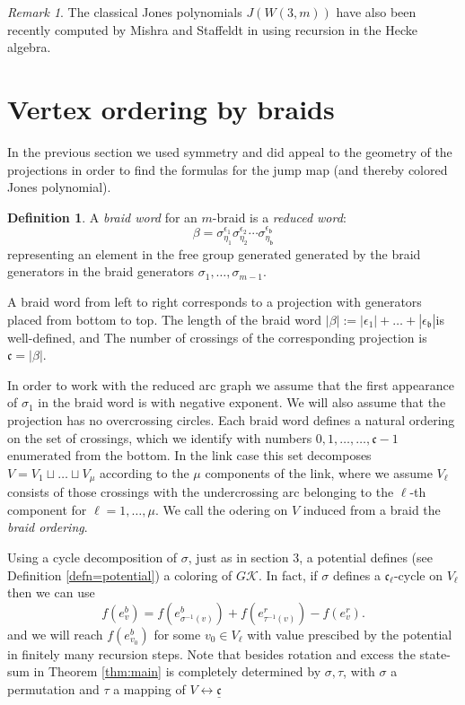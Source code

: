 \documentclass[11pt]{article}
\theoremstyle{definition}
\newtheorem{defn}{Definition}[section]
\theoremstyle{remark}
\newtheorem*{rem}{Remark}
\theoremstyle{remark}
\begin{document}
\begin{rem}
The classical Jones polynomials $J(W(3,m))$ have also been recently computed by Mishra and Staffeldt in \cite{MS} using recursion in the Hecke algebra.
\end{rem}

\section{Vertex ordering by braids}

In the previous section we used symmetry and did appeal to the geometry of the projections in order to find the formulas for the jump map (and thereby colored Jones polynomial). 

\begin{defn} A \textit{braid word} for an $m$-braid is a \textit{reduced word}:
$$\beta =\sigma_{\eta_1}^{\epsilon_1}\sigma_{\eta_2}^{\epsilon_2}\cdots \sigma_{\eta_{\mathfrak{b} }}^{\epsilon_{\mathfrak{b}}}$$
representing an element in the free group generated generated by the braid generators 
 in the braid generators $\sigma_1,\ldots ,\sigma_{m-1}$.
\end{defn}

A braid word from left to right corresponds to a projection with generators placed from bottom to top.  
The length of the braid word $|\beta |:=|\epsilon_1|+\ldots +|\epsilon_{\mathfrak{b}}|$is well-defined, and
The number of crossings of the corresponding projection is $\mathfrak{c}=|\beta |$.  

In order to work with the reduced arc graph we assume that the first appearance of $\sigma_1$ in the braid word is with negative exponent. We will also assume that the projection has no overcrossing circles. 
Each braid word defines a natural ordering on the set of crossings, which we identify with numbers $0,1,\ldots ,\ldots ,\mathfrak{c}-1$ enumerated from the bottom. In the link case this set decomposes $V=V_1\sqcup \ldots \sqcup V_{\mu}$ according to the $\mu $ components of the link, where we assume $V_{\ell }$ consists of those crossings with the undercrossing arc belonging to the $\ell $-th component for $\ell =1,\ldots ,\mu $. We call the odering on $V$ induced from a braid the \textit{braid ordering}. 


Using a cycle decomposition of $\sigma $, just as in section 3, a potential defines (see Definition \ref{defn=potential}) a coloring of $G\mathcal{K}$. In fact, if $\sigma $ defines a $\mathfrak{c}_{\ell }$-cycle on $V_{\ell }$ then we can use 
$$f(e_v^b)=f(e_{\sigma ^{-1}(v)}^b)+f(e_{\tau ^{-1}(v)}^r)-f(e_v^r).$$
and we will reach $f(e_{v_0}^b)$ for some $v_0\in V_{\ell }$ with value prescibed by the potential in finitely many recursion steps. Note that besides rotation and excess the state-sum in Theorem \ref{thm:main} is completely determined by $\sigma ,\tau $, with $\sigma $ a permutation and $\tau $ a mapping of $V\leftrightarrow \underline{\mathfrak{c}}$ 
\end{document}
